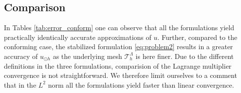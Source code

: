 \documentclass[r]{siamart171218}
\begin{document}

\subsection{Comparison}
In Tables \ref{tab:error_conform} one can observe that 
all the formulations yield practically identically accurate approximations of $u$.
Further, compared to the conforming case, the stabilized formulation \eqref{eq:problem2}
results in a greater accuracy of $u_{\odot h}$ as the underlying mesh $\mathcal{T}^{\Lambda}_{h}$ is
here finer. Due to the different definitions in the three formulations, comparision of the Lagrange
multiplier convergence is not straightforward. We therefore limit ourselves to a
comment that in the $L^2$ norm all the formulations yield faster than linear convergence.
\end{document}
